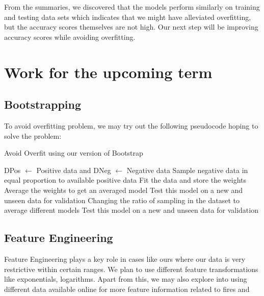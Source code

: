 \documentclass[10pt]{article}
\begin{document}



From the summaries, we discovered that the models perform similarly on training
and testing data sets which indicates that we might have alleviated
overfitting, but the accuracy scores themselves are not high. Our next step
will be improving accuracy scores while avoiding overfitting.\par

\section{Work for the upcoming term}
\subsection{Bootstrapping}
To avoid overfitting problem, we may try out the following pseudocode hoping to
solve the problem:
\begin{algorithm}
    \caption{Avoid Overfit using our version of Bootstrap}
    \begin{algorithmic}[lt]

        \STATE DPos $\gets$ Positive data and DNeg $\gets$ Negative
        data
        \STATE Sample negative data in equal proportion to available positive
        data
        \STATE Fit the data and store the weights
        \ENDFOR
        \STATE Average the weights to get an averaged model
        \STATE Test this model on a new and unseen data for validation
        \REQUIRE Changing the ratio of sampling in the dataset to average
        different models
        \STATE Test this model on a new and unseen data for validation
    \end{algorithmic}
\end{algorithm}

\subsection{Feature Engineering}
Feature Engineering plays a key role in cases like ours where our data is very
restrictive within certain ranges. We plan to use different feature
transformations like exponentials, logarithms. Apart from this, we may also
explore into using different data available online for more feature information
related to fires and
\end{document}
